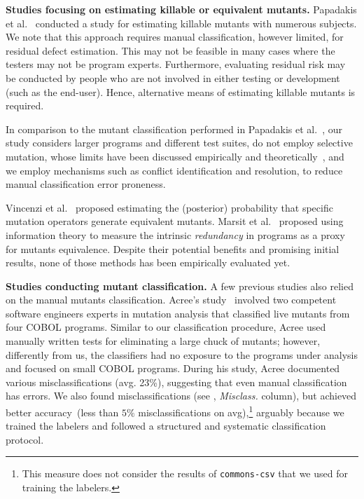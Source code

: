 \documentclass[sigconf]{acmart}
\begin{document}
\noindent\textbf{Studies focusing on estimating killable or equivalent mutants.}
Papadakis et al.~\cite{papadakis2014mitigating} conducted a study
for estimating killable mutants with numerous subjects.
We note that this approach requires manual classification,
however limited, for residual defect estimation.
This may not be feasible in many cases where the testers may not be program experts.
Furthermore, evaluating residual risk may be conducted by
people who are not involved in either testing or development (such as the end-user).
Hence, alternative means of estimating killable mutants is required.

In comparison to the mutant classification performed in Papadakis et al.~\cite{papadakis2014mitigating},
our study considers larger programs and different test suites, do not employ selective
mutation, whose limits have been discussed empirically and
theoretically~\cite{gopinath2017mutation,gopinath2016on}, and we employ
mechanisms such as conflict identification and resolution, to reduce manual
classification error proneness.

Vincenzi et al.~\cite{vincenzi2002bayesian} proposed
estimating the (posterior) probability that specific mutation operators
generate equivalent mutants.
Marsit et al.~\cite{marsit2017estimating,marsit2018impact,ayad2019estimating}
proposed using information theory %
to measure the intrinsic \emph{redundancy} in programs as a proxy for mutants equivalence. 
Despite their potential benefits and promising initial results,
none of those methods has been empirically evaluated yet.

\noindent\textbf{Studies conducting mutant classification.}
A few previous studies also relied on the manual mutants classification.
Acree's study~\cite{acree1980mutation} 
involved two competent software engineers experts in mutation analysis
that classified
live mutants from four COBOL programs.
Similar to our classification procedure, Acree used manually written tests
for eliminating a large chuck of mutants; however, differently 
from us, the classifiers had no exposure to the programs under analysis and
focused on small COBOL programs.
During his study, Acree documented various misclassifications (avg. 23\%),
suggesting that even manual classification has errors. 
We also found misclassifications (see , \emph{Misclass.} column),
but achieved better accuracy~(less than $5\%$ misclassifications on avg),\footnote{This measure does not consider the results of \texttt{commons-csv} that we used for training the labelers.}
arguably because we trained the labelers
and followed a structured and systematic classification protocol.
\end{document}
